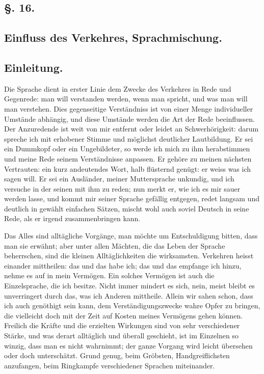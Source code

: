 {\label{sp.259}

\subsection*{§. 16.}\label{III.II.II.16}
\subsection*{Einfluss des Verkehres, Sprachmischung.}
\subsection*{Einleitung.}
Die Sprache dient in erster Linie dem Zwecke des Verkehres in Rede und Gegenrede: man will verstanden werden, wenn man spricht, und was man  will man verstehen. Dies gegenseitige Verständniss ist von einer Menge individueller Umstände abhängig, und diese Umstände werden die Art der Rede beeinflussen. Der Anzuredende ist weit von mir entfernt oder leidet an Schwerhörigkeit: darum spreche ich mit erhobener Stimme und möglichst deutlicher Lautbildung. Er sei ein Dummkopf oder ein Ungebildeter, so werde ich mich zu ihm herabstimmen und meine Rede seinem Verständnisse anpassen. Er gehöre zu meinen nächsten Vertrauten: ein kurz andeutendes Wort, halb flüsternd  genügt: er weiss was ich sagen will. Er sei ein Ausländer, meiner Muttersprache unkundig, und ich versuche in der seinen mit ihm zu reden; nun merkt er, wie ich es mir sauer werden lasse, und kommt mir  seiner Sprache gefällig entgegen, redet langsam und deutlich in gewählt einfachen Sätzen, mischt wohl auch soviel Deutsch in seine Rede, als er irgend zusammenbringen kann.

Das Alles sind alltägliche Vorgänge, man möchte um Entschuldigung bitten, dass man sie erwähnt; aber unter allen Mächten, die das Leben der Sprache beherrschen, sind die kleinen Alltäglichkeiten die wirksamsten. Verkehren heisst einander mittheilen: das und das habe ich; das und das empfange ich hinzu, nehme es auf in mein Vermögen. Ein solches Vermögen ist auch die Einzelsprache, die ich besitze. Nicht immer mindert es sich, nein, meist bleibt es unverringert durch das, was ich Anderen mittheile. Allein wir sahen schon, dass ich auch genöthigt sein kann, dem Verständigungszwecke wahre Opfer zu bringen, die viel\-\label{fp.255}leicht doch mit der Zeit auf Kosten meines Vermögens gehen können. Freilich die Kräfte und die erzielten Wirkungen sind von sehr verschiedener Stärke, und was derart alltäglich und überall geschieht, ist im Einzelnen so winzig, dass man es nicht wahrnimmt; der ganze Vorgang wird leicht übersehen oder doch unterschätzt. Grund genug, beim Gröbsten, Handgreiflichsten anzufangen, beim Ringkampfe verschiedener Sprachen miteinander.

}
